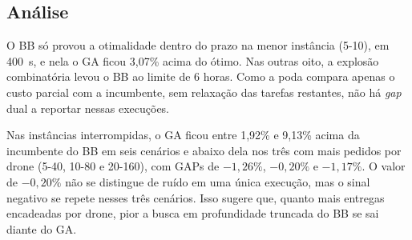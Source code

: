 \begin{table}[htbp]
\centering
\small
\caption{Comparação de desempenho entre \textit{Branch and Bound} (BB) e Algoritmo Genético (GA).}
\label{tab:comparacao_bb_ga}
\end{table}

\subsection*{Análise}

O BB só provou a otimalidade dentro do prazo na menor instância (5-10), em 400~s, e nela o GA ficou 3,07\% acima do ótimo. Nas outras oito, a explosão combinatória levou o BB ao limite de 6 horas. Como a poda compara apenas o custo parcial com a incumbente, sem relaxação das tarefas restantes, não há \textit{gap} dual a reportar nessas execuções.

Nas instâncias interrompidas, o GA ficou entre 1,92\% e 9,13\% acima da incumbente do BB em seis cenários e abaixo dela nos três com mais pedidos por drone (5-40, 10-80 e 20-160), com GAPs de $-1{,}26\%$, $-0{,}20\%$ e $-1{,}17\%$. O valor de $-0{,}20\%$ não se distingue de ruído em uma única execução, mas o sinal negativo se repete nesses três cenários. Isso sugere que, quanto mais entregas encadeadas por drone, pior a busca em profundidade truncada do BB se sai diante do GA.


